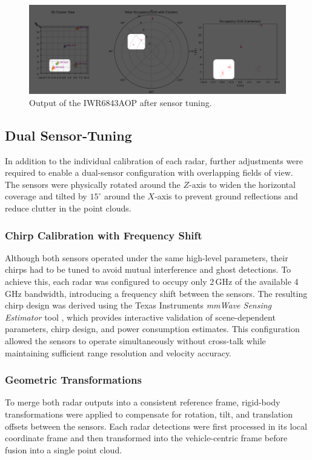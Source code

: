 \begin{figure}[!htbp]
    \centering
    \includegraphics[width=1.0\linewidth]{images/calib_ex2.png}
    \caption{Output of the IWR6843AOP after sensor tuning.}
    \label{fig:IWR6843AOP Calibration example2 for the sensor}
\end{figure}

\subsection{Dual Sensor-Tuning} 
In addition to the individual calibration of each radar, further adjustments were required to enable a dual-sensor configuration with overlapping fields of view. 
The sensors were physically rotated around the $Z$-axis to widen the horizontal coverage and tilted by $15^\circ$ around the $X$-axis to prevent ground reflections and reduce clutter in the point clouds. 

\subsubsection{Chirp Calibration with Frequency Shift} 
Although both sensors operated under the same high-level parameters, their chirps had to be tuned to avoid mutual interference and ghost detections. 
To achieve this, each radar was configured to occupy only 2\,GHz of the available 4\,GHz bandwidth, introducing a frequency shift between the sensors. 
The resulting chirp design was derived using the Texas Instruments \textit{mmWave Sensing Estimator} tool \cite{understanding_uart}, which provides interactive validation of scene-dependent parameters, chirp design, and power consumption estimates. 
This configuration allowed the sensors to operate simultaneously without cross-talk while maintaining sufficient range resolution and velocity accuracy. 

\subsubsection{Geometric Transformations} 
To merge both radar outputs into a consistent reference frame, rigid-body transformations were applied to compensate for rotation, tilt, and translation offsets between the sensors. 
Each radar detections were first processed in its local coordinate frame and then transformed into the vehicle-centric frame before fusion into a single point cloud. 

